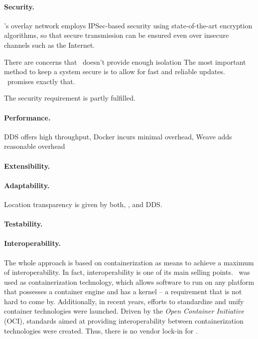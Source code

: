 \wnet 

\paragraph{Security.}
\wnet 's overlay network employs IPSec-based security using state-of-the-art encryption algorithms, so that secure transmission can be ensured even over insecure channels such as the Internet.


There are concerns that \docker\ doesn't provide enough isolation  
The most important method to keep a system secure is to allow for fast and reliable updates. \docker\ promises exactly that.

The security requirement is partly fulfilled.

\paragraph{Performance.}
DDS offers high throughput, Docker incurs minimal overhead, Weave adds reasonable overhead

\paragraph{Extensibility.}

\paragraph{Adaptability.}
Location transparency is given by both, \wnet , and DDS.

\paragraph{Testability.}


\paragraph{Interoperability.}
The whole approach is based on containerization as means to achieve a maximum of interoperability. In fact, interoperability is one of its main selling points. \docker\ was used as containerization technology, which allows software to run on any platform that possesses a container engine and has a kernel -- a requirement that is not hard to come by. Additionally, in recent years, efforts to standardize and unify container technologies were launched. Driven by the \emph{Open Container Initiative} (OCI), standards aimed at providing interoperability between containerization technologies were created. Thus, there is no vendor lock-in for \docker .

